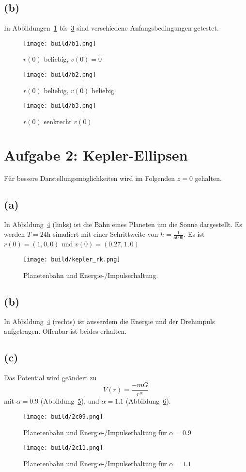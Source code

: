 \documentclass{scrartcl}
\begin{document}
\subsection*{(b)}
In Abbildungen~\ref{fig:b1} bis~\ref{fig:b3} sind verschiedene Anfangsbedingungen getestet.
\begin{figure}[ht]
  \centering
  \texttt{[image: build/b1.png]}
  \caption{$r(0)$ beliebig, $v(0) = 0$}%
  \label{fig:b1}
\end{figure}
\begin{figure}[ht]
  \centering
  \texttt{[image: build/b2.png]}
  \caption{$r(0)$ beliebig, $v(0)$ beliebig}%
  \label{fig:b2}
\end{figure}
\begin{figure}[ht]
  \centering
  \texttt{[image: build/b3.png]}
  \caption{$r(0)$ senkrecht $v(0)$}%
  \label{fig:b3}
\end{figure}

\section*{Aufgabe 2: Kepler-Ellipsen}
Für bessere Darstellungsmöglichkeiten wird im Folgenden $z = 0$ gehalten.
\subsection*{(a)}

In Abbildung~\ref{fig:kepler} (links) ist die Bahn eines Planeten um die Sonne dargestellt.
Es werden $T= 24$h simuliert mit einer Schrittweite von $h = \frac{1}{5000}$.
Es ist $r(0) = (1, 0, 0)$ und $v(0) = (0.27, 1, 0)$
\begin{figure}[ht]
  \centering
  \texttt{[image: build/kepler\_rk.png]}
  \caption{Planetenbahn und Energie-/Impulserhaltung.}%
  \label{fig:kepler}
\end{figure}
\subsection*{(b)}
In Abbildung~\ref{fig:kepler} (rechts) ist ausserdem die Energie und der Drehimpuls aufgetragen.
Offenbar ist beides erhalten.
\subsection*{(c)}
Das Potential wird geändert zu
\begin{equation}
  V(r) = \frac{-mG}{r^\alpha}
\end{equation}
mit $\alpha = 0.9$ (Abbildung~\ref{fig:2c09}),
und $\alpha = 1.1$ (Abbildung~\ref{fig:2c11}).
\begin{figure}[ht]
  \centering
  \texttt{[image: build/2c09.png]}
  \caption{Planetenbahn und Energie-/Impulserhaltung für $\alpha = 0.9$}%
  \label{fig:2c09}
\end{figure}
\begin{figure}[ht]
  \centering
  \texttt{[image: build/2c11.png]}
  \caption{Planetenbahn und Energie-/Impulserhaltung für $\alpha = 1.1$}%
  \label{fig:2c11}
\end{figure}
\end{document}
